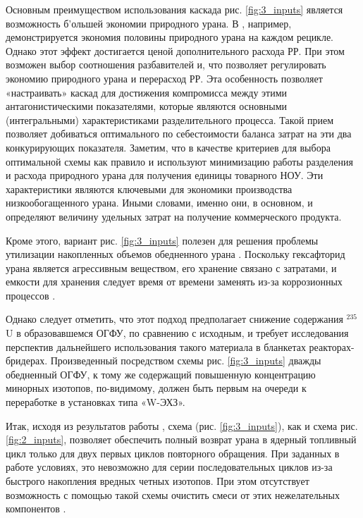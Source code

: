 Основным преимуществом использования каскада рис. \ref{fig:3_inputs} является возможность б'ольшей экономии природного урана.
В \cite{smirnovApplyingEnrichmentCapacities2018}, например, демонстрируется экономия половины природного урана на каждом рецикле.
Однако этот эффект достигается ценой дополнительного расхода РР. При этом возможен выбор соотношения разбавителей и, что позволяет регулировать экономию природного урана и перерасход РР.
Эта особенность позволяет «настраивать» каскад для достижения компромисса между этими антагонистическими показателями, которые являются основными (интегральными) характеристиками разделительного процесса.
Такой прием позволяет добиваться оптимального по себестоимости баланса затрат на эти два конкурирующих показателя.
Заметим, что в качестве критериев для выбора оптимальной схемы как правило и используют минимизацию работы разделения и расхода природного урана для получения единицы товарного НОУ. Эти характеристики являются ключевыми для экономики производства низкообогащенного урана. Иными словами, именно они, в основном, и определяют величину удельных затрат на получение коммерческого продукта.

Кроме этого, вариант рис. \ref{fig:3_inputs} полезен для решения проблемы утилизации накопленных объемов обедненного урана \cite{smirnovEnrichmentRegeneratedUranium2014}. Поскольку гексафторид урана является агрессивным веществом, его хранение связано с затратами, и емкости для хранения следует время от времени заменять из-за коррозионных процессов \cite{fitchOPTIONSDISPOSALREAPPLICATION2009, oecdManagementDepletedUranium2001}.

Однако следует отметить, что этот подход предполагает снижение содержания $^{235}$U в образовавшемся ОГФУ, по сравнению с исходным, и требует исследования перспектив дальнейшего использования такого материала в бланкетах реакторах-бридерах.
Произведенный посредством схемы рис. \ref{fig:3_inputs} дважды обедненный ОГФУ, к тому же содержащий повышенную концентрацию минорных изотопов, по-видимому, должен быть первым на очереди к переработке в установках типа «W-ЭХЗ».

Итак, исходя из результатов работы \cite{smirnovApplyingEnrichmentCapacities2018}, схема (рис. \ref{fig:3_inputs}), как и схема рис. \ref{fig:2_inputs}, позволяет обеспечить полный возврат урана в ядерный топливный цикл только для двух первых циклов повторного обращения.
При заданных в работе \cite{smirnovApplyingEnrichmentCapacities2018} условиях, это невозможно для серии последовательных циклов из-за быстрого накопления вредных четных изотопов. При  этом отсутствует возможность с помощью такой схемы очистить смеси от этих нежелательных компонентов \cite{smirnovApplyingEnrichmentCapacities2018}.

